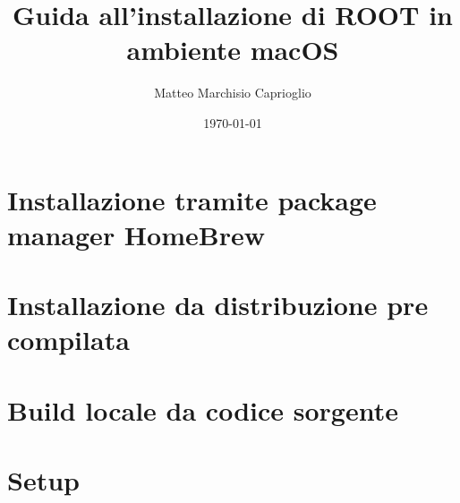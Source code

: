 \documentclass[12pt,a4paper]{article}
\title{Guida all'installazione di ROOT in ambiente macOS}
\author{Matteo Marchisio Caprioglio}
\date{\today}
\begin{document}
\maketitle
\newpage

\begin{abstract}
	
\end{abstract}

\newpage

\tableofcontents

\newpage

\section{Installazione tramite package manager HomeBrew}
\label{brew}


\section{Installazione da distribuzione pre compilata}
\label{sec:pre-comp}


\section{Build locale da codice sorgente}
\label{sec:build}


\section{Setup}
\label{sec:setup}



\newpage

\begin{comment}
\section{Documentazione}
\begin{itemize}
	\item \hyperref{https://root.cern}{}{}{Sito di ROOT - documentazione completa}
	\item \hyperref{https://root.cern/install/all_releases/}{}{}{Releases di ROOT}
	\item \hyperref{https://www.howtogeek.com/444596/how-to-change-the-default-shell-to-bash-in-macos-catalina/}{}{}{Come cambiare la shell di default di macOS}
	\item \hyperref{https://www.gnu.org/savannah-checkouts/gnu/bash/manual/bash.html#Controlling-the-Prompt}{}{}{Manuale comandi shell}
	\item \hyperref{https://wiki.gentoo.org/wiki/Vim/Guide}{}{}{Guida Vim}
\end{itemize}
\end{comment}



\end{document}
